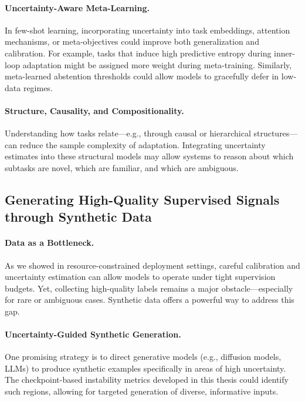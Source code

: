 \paragraph{Uncertainty-Aware Meta-Learning.} In few-shot learning, incorporating uncertainty into task embeddings, attention mechanisms, or meta-objectives could improve both generalization and calibration. For example, tasks that induce high predictive entropy during inner-loop adaptation might be assigned more weight during meta-training. Similarly, meta-learned abstention thresholds could allow models to gracefully defer in low-data regimes.

\paragraph{Structure, Causality, and Compositionality.} Understanding how tasks relate—e.g., through causal or hierarchical structures—can reduce the sample complexity of adaptation. Integrating uncertainty estimates into these structural models may allow systems to reason about which subtasks are novel, which are familiar, and which are ambiguous.

\subsection{Generating High-Quality Supervised Signals through Synthetic Data}

\paragraph{Data as a Bottleneck.} As we showed in resource-constrained deployment settings, careful calibration and uncertainty estimation can allow models to operate under tight supervision budgets. Yet, collecting high-quality labels remains a major obstacle—especially for rare or ambiguous cases. Synthetic data offers a powerful way to address this gap.

\paragraph{Uncertainty-Guided Synthetic Generation.} One promising strategy is to direct generative models (e.g., diffusion models, LLMs) to produce synthetic examples specifically in areas of high uncertainty. The checkpoint-based instability metrics developed in this thesis could identify such regions, allowing for targeted generation of diverse, informative inputs.

